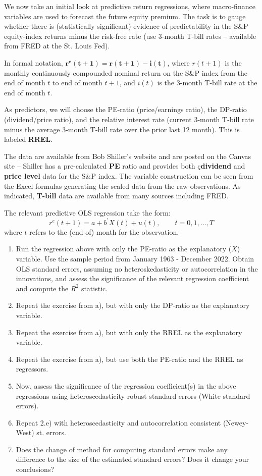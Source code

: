 \documentclass[12pt,twoside]{article}
\begin{document}
We now take an initial look at predictive return regressions, where macro-finance variables are used to forecast the future equity premium. The task is to gauge whether there is (statistically significant) evidence of predictability in the S\&P equity-index returns minus the risk-free rate (use 3-month T-bill rates – available from FRED at the St. Louis Fed). \par
In formal notation, \(\mathbf{r^e(t+1)=r(t+1)-i(t)}\), where \(r(t+1)\) is the monthly continuously compounded nominal return on the S\&P index from the end of month \(t\) to end of month \(t+1\), and \(i(t)\) is the 3-month T-bill rate at the end of month \(t\). \par
As predictors, we will choose the PE-ratio (price/earnings ratio), the DP-ratio (dividend/price ratio), and the relative interest rate (current 3-month T-bill rate minus the average 3-month T-bill rate over the prior last 12 month). This is labeled \textbf{RREL}. \par
The data are available from Bob Shiller’s website and are posted on the Canvas site – Shiller has a pre-calculated \textbf{PE} ratio and provides both ç\textbf{dividend} and \textbf{price level} data for the S\&P index. The variable construction can be seen from the Excel formulas generating the scaled data from the raw observations. As indicated, \textbf{T-bill} data are available from
many sources including FRED. \par
The relevant predictive OLS regression take the form:
\[
    r^e(t+1) = a + b^\prime X(t) + u(t), \hspace{25pt} t = 0,1,\dots,T
\]
where \(t\) refers to the (end of) month for the observation.

\begin{enumerate}[label = \alph*)]
    \item Run the regression above with only the PE-ratio as the explanatory (\(X\)) variable. Use the sample period from January 1963 - December 2022. Obtain OLS standard errors, assuming no heteroskedasticity or autocorrelation in the innovations, and assess the significance of the relevant regression coefficient and compute the \(R^2\) statistic.
    \item Repeat the exercise from a), but with only the DP-ratio as the explanatory variable.
    \item Repeat the exercise from a), but with only the RREL as the explanatory variable.
    \item Repeat the exercise from a), but use both the PE-ratio and the RREL as regressors.
    \item Now, assess the significance of the regression coefficient(s) in the above regressions using heteroscedasticity robust standard errors (White standard errors).
    \item Repeat 2.e) with heteroscedasticity and autocorrelation consistent (Newey-West) st. errors.
    \item Does the change of method for computing standard errors make any difference to the size of the estimated standard errors? Does it change your conclusions?
\end{enumerate}
\end{document}
